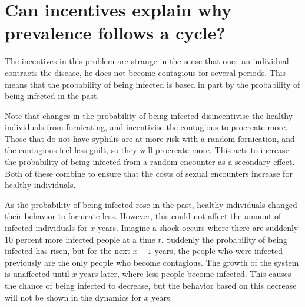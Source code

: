 \documentclass[12pt]{paper}
\begin{document}






\section*{Can incentives explain why prevalence follows a cycle?}

The incentives in this problem are strange in the sense that once an
individual contracts the disease, he does not become contagious for
several periods. This means that the probability of being infected is
based in part by the probability of being infected in the past.

Note that changes in the probability of being infected disincentivise
the healthy individuals from fornicating, and incentivise the
contagious to procreate more. Those that do not have syphilis are at
more risk with a random fornication, and the contagious feel less
guilt, so they will procreate more. This acts to increase the
probability of being infected from a random encounter as a secondary
effect. Both of these combine to ensure that the costs of sexual
encounters increase for healthy individuals.

As the probability of being infected rose in the past, healthy
individuals changed their behavior to fornicate less. However, this
could not affect the amount of infected individuals for $x$
years. Imagine a shock occurs where there are suddenly $10$ percent
more infected people at a time $t$. Suddenly the probability of being
infected has risen, but for the next $x-1$ years, the people who were
infected previously are the only people who become contagious. The
growth of the system is unaffected until $x$ years later, where less
people become infected. This causes the chance of being infected to
decrease, but the behavior based on this decrease will not be shown in
the dynamics for $x$ years.
\end{document}
